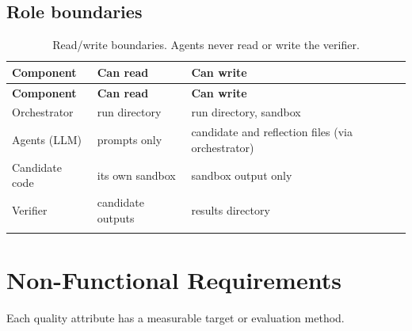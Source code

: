 \documentclass[12pt,a4paper]{article}
\begin{document}
\subsection{Role boundaries}

\begin{center}
\footnotesize
\setlength{\tabcolsep}{4pt}
\begin{longtable}{@{}p{3.2cm}p{4.6cm}p{5.0cm}@{}}
\toprule
\textbf{Component} & \textbf{Can read} & \textbf{Can write} \\
\midrule
\endfirsthead
\toprule
\textbf{Component} & \textbf{Can read} & \textbf{Can write} \\
\midrule
\endhead
\bottomrule
\endfoot

Orchestrator & run directory & run directory, sandbox \\
\addlinespace[2pt]
Agents (LLM) & prompts only & candidate and reflection files (via orchestrator) \\
\addlinespace[2pt]
Candidate code & its own sandbox & sandbox output only \\
\addlinespace[2pt]
Verifier & candidate outputs & results directory \\
\bottomrule
\caption{Read/write boundaries. Agents never read or write the verifier.}
\label{tab:roles}
\end{longtable}
\end{center}

\section{Non-Functional Requirements}

Each quality attribute has a measurable target or evaluation method.
\end{document}

